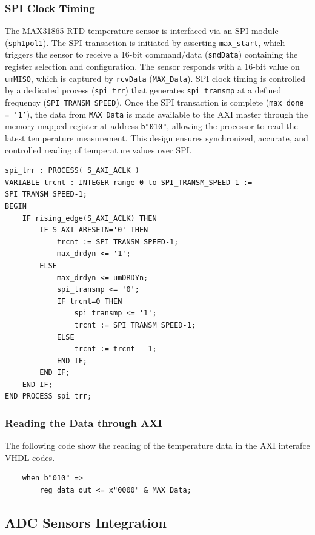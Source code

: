 \subsubsection{SPI Clock Timing}
The MAX31865 RTD temperature sensor is interfaced via an SPI module (\texttt{sph1pol1}). The SPI transaction is initiated by asserting \texttt{max\_start}, which triggers the sensor to receive a 16-bit command/data (\texttt{sndData}) containing the register selection and configuration. The sensor responds with a 16-bit value on \texttt{umMISO}, which is captured by \texttt{rcvData} (\texttt{MAX\_Data}). SPI clock timing is controlled by a dedicated process (\texttt{spi\_trr}) that generates \texttt{spi\_transmp} at a defined frequency (\texttt{SPI\_TRANSM\_SPEED}). Once the SPI transaction is complete (\texttt{max\_done = '1'}), the data from \texttt{MAX\_Data} is made available to the AXI master through the memory-mapped register at address \texttt{b"010"}, allowing the processor to read the latest temperature measurement. This design ensures synchronized, accurate, and controlled reading of temperature values over SPI.

\begin{verbatim}
spi_trr : PROCESS( S_AXI_ACLK )
VARIABLE trcnt : INTEGER range 0 to SPI_TRANSM_SPEED-1 := SPI_TRANSM_SPEED-1;
BEGIN
    IF rising_edge(S_AXI_ACLK) THEN
        IF S_AXI_ARESETN='0' THEN
            trcnt := SPI_TRANSM_SPEED-1;
            max_drdyn <= '1';
        ELSE
            max_drdyn <= umDRDYn;
            spi_transmp <= '0';
            IF trcnt=0 THEN
                spi_transmp <= '1';
                trcnt := SPI_TRANSM_SPEED-1;
            ELSE
                trcnt := trcnt - 1;
            END IF;
        END IF;
    END IF;
END PROCESS spi_trr;
\end{verbatim}


\subsubsection{Reading the Data through AXI}
The following code show the reading of the temperature data in the AXI interafce VHDL codes. 
\begin{verbatim}
	when b"010" =>
	    reg_data_out <= x"0000" & MAX_Data;
\end{verbatim}


\subsection{ADC Sensors Integration}

